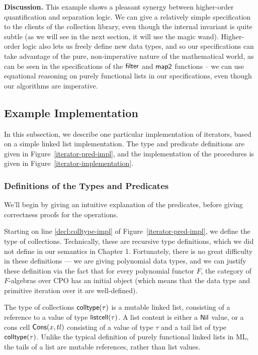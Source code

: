 \textbf{Discussion.} This example shows a pleasant synergy between
higher-order quantification and separation logic. We can give a
relatively simple specification to the clients of the collection
library, even though the internal invariant is quite subtle (as we
will see in the next section, it will use the magic wand). Higher-order
logic also lets us freely define new data types, and so our
specifications can take advantage of the pure, non-imperative nature
of the mathematical world, as can be seen in the specifications of the
$\mathsf{filter}$ and $\mathsf{map2}$ functions -- we can use equational
reasoning on purely functional lists in our specifications, even
though our algorithms are imperative.


\subsection{Example Implementation}

In this subsection, we describe one particular implementation of
iterators, based on a simple linked list implementation. The type and
predicate definitions are given in Figure~\ref{iterator-pred-impl},
and the implementation of the procedures is given in
Figure~\ref{iterator-implementation}. 


\subsubsection{Definitions of the Types and Predicates}

We'll begin by giving an intuitive explanation of the predicates,
before giving correctness proofs for the operations.

Starting on line \ref{decl:colltype-impl} of
Figure~\ref{iterator-pred-impl}, we define the type of
collections. Technically, these are recursive type definitions, which
we did not define in our semantics in Chapter 1. Fortunately, there is
no great difficulty in these definitions --- we are giving polynomial
data types, and we can justify these definition via the fact that for
every polynomial functor $F$, the category of $F$-algebras over CPO
has an initial object (which means that the data type and primitive
iteration over it are well-defined).

The type of collections $\mathsf{colltype}(\tau)$ is a mutable linked list,
consisting of a reference to a value of type $\mathsf{listcell}(\tau)$. A
list content is either a $\mathsf{Nil}$ value, or a cons cell $\mathsf{Cons}(x, tl)$
consisting of a value of type $\tau$ and a tail list of type
$\mathsf{colltype}(\tau)$. Unlike the typical definition of purely functional
linked lists in ML, the tails of a list are mutable references, rather
than list values.

